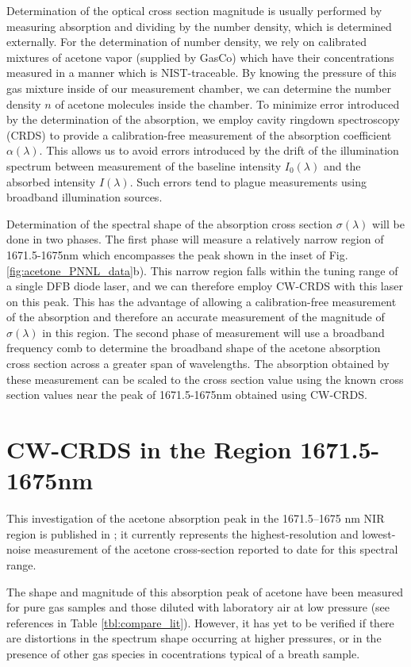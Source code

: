 \documentclass[8pt,a4paper]{report}
\begin{document}
	Determination of the optical cross section magnitude is usually performed by measuring absorption and dividing by the number density, which is determined externally. For the determination of number density, we rely on calibrated mixtures of acetone vapor (supplied by GasCo) which have their concentrations measured in a manner which is NIST-traceable. By knowing the pressure of this gas mixture inside of our measurement chamber, we can determine the number density $n$ of acetone molecules inside the chamber. To minimize error introduced by the determination of the absorption, we employ cavity ringdown spectroscopy (CRDS) to provide a calibration-free measurement of the absorption coefficient $\alpha(\lambda)$. This allows us to avoid errors introduced by the drift of the illumination spectrum between measurement of the baseline intensity $I_0(\lambda)$ and the absorbed intensity $I(\lambda)$. Such errors tend to plague measurements using broadband illumination sources.
	
	Determination of the spectral shape of the absorption cross section $\sigma(\lambda)$ will be done in two phases. The first phase will measure a relatively narrow region of 1671.5-1675nm which encompasses the peak shown in the inset of Fig. \ref{fig:acetone_PNNL_data}b). This narrow region falls within the tuning range of a single DFB diode laser, and we can therefore employ CW-CRDS with this laser on this peak. This has the advantage of allowing a calibration-free measurement of the absorption and therefore an accurate measurement of the magnitude of $\sigma(\lambda)$ in this region. The second phase of measurement will use a broadband frequency comb to determine the broadband shape of the acetone absorption cross section across a greater span of wavelengths. The absorption obtained by these measurement can be scaled to the cross section value using the known cross section values near the peak of 1671.5-1675nm obtained using CW-CRDS.
	
	\section{CW-CRDS in the Region 1671.5-1675nm} \label{sec:acetone_peak}
	This investigation of the acetone absorption peak in the 1671.5–1675 nm NIR region is published in \cite{mine_acetone}; it currently represents the highest-resolution and lowest-noise measurement of the acetone cross-section reported to date for this spectral range.
	
	The shape and magnitude of this absorption peak of acetone have been measured for pure gas samples and those diluted with laboratory air at low pressure (see references in Table \ref{tbl:compare_lit}). However, it has yet to be verified if there are distortions in the spectrum shape occurring at higher pressures, or in the presence of other gas species in cocentrations typical of a breath sample.
	
\end{document}
